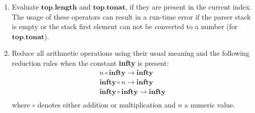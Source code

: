 \documentclass[preprint,12pt]{elsarticle}
\theoremstyle{definition}
\begin{document}
\begin{enumerate}
  \item Evaluate $\mathbf{top.length}$ and $\mathbf{top.tonat}$, if
    they are present in the current index. The usage of these operators
    can result in a run-time error if the parser stack is empty or the
    stack first element can not be converted to a number (for $\mathbf{top.tonat}$).
  \item Reduce all arithmetic operations using their usual meaning and
    the following reduction rules
    when the constant \textbf{infty} is present:
\[
  \begin{array}{c}
    n \circ \mathbf{infty} \rightarrow \mathbf{infty}\\
    \mathbf{infty}\circ n \rightarrow \mathbf{infty}\\
    \mathbf{infty}\circ\mathbf{infty} \rightarrow \mathbf{infty}\\
  \end{array}
\]
where $\circ$ denotes either addition or multiplication and $n$ a
numeric value.
\end{enumerate}
\end{document}
